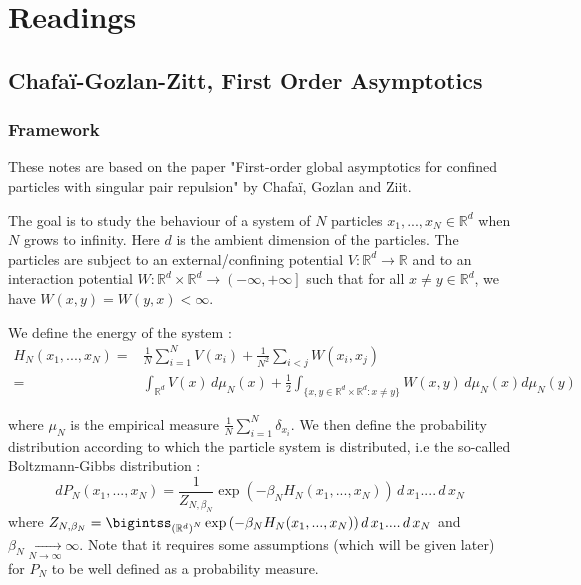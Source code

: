 \documentclass[a4paper,12pt]{report}
\begin{document}
\chapter{Readings}

\section{Chafaï-Gozlan-Zitt, First Order Asymptotics}\label{Chafaï-Gozlan-Zitt}

\subsection{Framework}

These notes are based on the paper "First-order global asymptotics for confined particles with singular pair repulsion" by Chafaï, Gozlan and Ziit. \cite{chafai-gozlan-zitt}

The goal is to study the behaviour of a system of $N$ particles $x_1, ..., x_N \in \mathbb{R}^{d}$ when $N$ grows to infinity. Here $d$ is the ambient dimension of the particles. The particles are subject to an external/confining potential $V : \mathbb{R}^{d} \longrightarrow \mathbb{R}$ and to an interaction potential $W : \mathbb{R}^{d} \times \mathbb{R}^{d} \longrightarrow \left(-\infty, +\infty\right]$ such that for all $x \neq y \in \mathbb{R}^{d}$, we have $W(x, y) = W(y, x) < \infty$.

We define the energy of the system :
\begin{align*}
    H_{N}\left(x_1, ..., x_N\right) =& \frac{1}{N}\sum\limits_{i =1}^{N} V(x_i) + \frac{1}{N^2}\sum\limits_{i < j} W(x_i, x_j)\\
    =& \int_{\mathbb{R}^{d}} V(x) \,d\mu_{N}(x) + \frac{1}{2} \int_{\{x, y \in \mathbb{R}^{d}\times \mathbb{R}^{d} : x \neq y\}} W(x, y)\, d\mu_{N}(x) d\mu_{N}(y) 
\end{align*}

where $\mu_{N}$ is the empirical measure $\frac{1}{N}\sum\limits_{i=1}^{N} \delta_{x_i}$. We then define the probability distribution according to which the particle system is distributed, i.e the so-called Boltzmann-Gibbs distribution :
\[dP_{N}(x_1, ..., x_N) = \frac{1}{Z_{N, \beta_{N}}} \exp{\left(-\beta_{N} H_{N}(x_1, ..., x_N)\right)}\,d\,x_{1}....\,d\,x_{N}\]
where $Z_{N, \beta_{N}} = \bigintss_{\left(\mathbb{R}^{d}\right)^{N}} \exp{\left(-\beta_{N} H_{N}(x_1, ..., x_N)\right)}\,d\,x_{1}....\,d\,x_{N}$ and $\beta_{N} \underset{N \longrightarrow \infty}{\longrightarrow} \infty$. Note that it requires some assumptions (which will be given later) for $P_{N}$ to be well defined as a probability measure.
\vspace{0.5cm}
\end{document}
